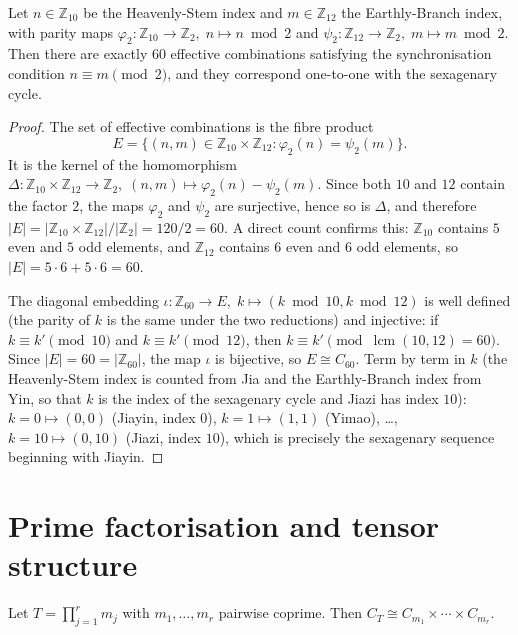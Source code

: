 \begin{lemma}\label{ch20_ganzhi_parity_filter}
Let $n \in \mathbb{Z}_{10}$ be the Heavenly-Stem index and $m \in \mathbb{Z}_{12}$ the Earthly-Branch index, with parity maps $\varphi_2: \mathbb{Z}_{10} \to \mathbb{Z}_2,\; n \mapsto n \bmod 2$ and $\psi_2: \mathbb{Z}_{12} \to \mathbb{Z}_2,\; m \mapsto m \bmod 2$. Then there are exactly $60$ effective combinations satisfying the synchronisation condition $n \equiv m \pmod 2$, and they correspond one-to-one with the sexagenary cycle.
\end{lemma}

\begin{proof}
The set of effective combinations is the fibre product
\[
E = \{(n,m) \in \mathbb{Z}_{10} \times \mathbb{Z}_{12} : \varphi_2(n) = \psi_2(m)\}.
\]
It is the kernel of the homomorphism $\Delta: \mathbb{Z}_{10} \times \mathbb{Z}_{12} \to \mathbb{Z}_2,\; (n,m) \mapsto \varphi_2(n) - \psi_2(m)$. Since both $10$ and $12$ contain the factor $2$, the maps $\varphi_2$ and $\psi_2$ are surjective, hence so is $\Delta$, and therefore $|E| = |\mathbb{Z}_{10} \times \mathbb{Z}_{12}| / |\mathbb{Z}_2| = 120/2 = 60$. A direct count confirms this: $\mathbb{Z}_{10}$ contains $5$ even and $5$ odd elements, and $\mathbb{Z}_{12}$ contains $6$ even and $6$ odd elements, so $|E| = 5\cdot 6 + 5\cdot 6 = 60$.

The diagonal embedding $\iota: \mathbb{Z}_{60} \to E,\; k \mapsto (k \bmod 10, k \bmod 12)$ is well defined (the parity of $k$ is the same under the two reductions) and injective: if $k \equiv k' \pmod{10}$ and $k \equiv k' \pmod{12}$, then $k \equiv k' \pmod{\operatorname{lcm}(10,12) = 60}$. Since $|E| = 60 = |\mathbb{Z}_{60}|$, the map $\iota$ is bijective, so $E \cong C_{60}$. Term by term in $k$ (the Heavenly-Stem index is counted from Jia and the Earthly-Branch index from Yin, so that $k$ is the index of the sexagenary cycle and Jiazi has index $10$): $k=0 \mapsto (0,0)$ (Jiayin, index $0$), $k=1 \mapsto (1,1)$ (Yimao), \dots, $k=10 \mapsto (0,10)$ (Jiazi, index $10$), which is precisely the sexagenary sequence beginning with Jiayin.
\end{proof}

\section{Prime factorisation and tensor structure}

\begin{theorem}\label{thm:cyclic_direct_product_yijing}
Let $T = \prod_{j=1}^r m_j$ with $m_1, \dots, m_r$ pairwise coprime. Then $C_T \cong C_{m_1} \times \cdots \times C_{m_r}$.
\end{theorem}

